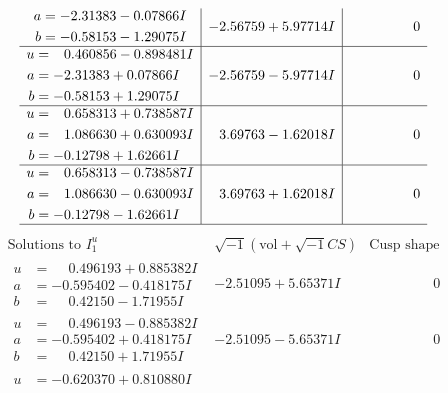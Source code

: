 \documentclass[1p]{elsarticle_modified}
\theoremstyle{definition}
\newcommand{\I}{\sqrt{-1}}
\begin{document}
$$\begin{array}{c|c|c}
\begin{aligned}
a &= -2.31383 - 0.07866 I \\
b &= -0.58153 - 1.29075 I\end{aligned}
 & -2.56759 + 5.97714 I & \phantom{-0.000000 } 0 \\ \hline\begin{aligned}
u &= \phantom{-}0.460856 - 0.898481 I \\
a &= -2.31383 + 0.07866 I \\
b &= -0.58153 + 1.29075 I\end{aligned}
 & -2.56759 - 5.97714 I & \phantom{-0.000000 } 0 \\ \hline\begin{aligned}
u &= \phantom{-}0.658313 + 0.738587 I \\
a &= \phantom{-}1.086630 + 0.630093 I \\
b &= -0.12798 + 1.62661 I\end{aligned}
 & \phantom{-}3.69763 - 1.62018 I & \phantom{-0.000000 } 0 \\ \hline\begin{aligned}
u &= \phantom{-}0.658313 - 0.738587 I \\
a &= \phantom{-}1.086630 - 0.630093 I \\
b &= -0.12798 - 1.62661 I\end{aligned}
 & \phantom{-}3.69763 + 1.62018 I & \phantom{-0.000000 } 0\\
 \hline 
 \end{array}$$\newpage$$\begin{array}{c|c|c}  
\text{Solutions to }I^u_{1}& \I (\text{vol} + \sqrt{-1}CS) & \text{Cusp shape}\\
 \hline 
\begin{aligned}
u &= \phantom{-}0.496193 + 0.885382 I \\
a &= -0.595402 - 0.418175 I \\
b &= \phantom{-}0.42150 - 1.71955 I\end{aligned}
 & -2.51095 + 5.65371 I & \phantom{-0.000000 } 0 \\ \hline\begin{aligned}
u &= \phantom{-}0.496193 - 0.885382 I \\
a &= -0.595402 + 0.418175 I \\
b &= \phantom{-}0.42150 + 1.71955 I\end{aligned}
 & -2.51095 - 5.65371 I & \phantom{-0.000000 } 0 \\ \hline\begin{aligned}
u &= -0.620370 + 0.810880 I \\

\end{aligned}
\end{array}$$
\end{document}
